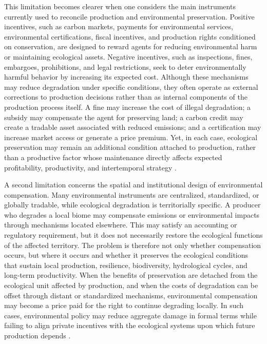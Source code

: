 

This limitation becomes clearer when one considers the main instruments currently used to reconcile production and environmental preservation. Positive incentives, such as carbon markets, payments for environmental services, environmental certifications, fiscal incentives, and production rights conditioned on conservation, are designed to reward agents for reducing environmental harm or maintaining ecological assets. Negative incentives, such as inspections, fines, embargoes, prohibitions, and legal restrictions, seek to deter environmentally harmful behavior by increasing its expected cost. Although these mechanisms may reduce degradation under specific conditions, they often operate as external corrections to production decisions rather than as internal components of the production process itself. A fine may increase the cost of illegal degradation; a subsidy may compensate the agent for preserving land; a carbon credit may create a tradable asset associated with reduced emissions; and a certification may increase market access or generate a price premium. Yet, in each case, ecological preservation may remain an additional condition attached to production, rather than a productive factor whose maintenance directly affects expected profitability, productivity, and intertemporal strategy \cite{placeholder_positive_incentives, placeholder_enforcement}.

A second limitation concerns the spatial and institutional design of environmental compensation. Many environmental instruments are centralized, standardized, or globally tradable, while ecological degradation is territorially specific. A producer who degrades a local biome may compensate emissions or environmental impacts through mechanisms located elsewhere. This may satisfy an accounting or regulatory requirement, but it does not necessarily restore the ecological functions of the affected territory. The problem is therefore not only whether compensation occurs, but where it occurs and whether it preserves the ecological conditions that sustain local production, resilience, biodiversity, hydrological cycles, and long-term productivity. When the benefits of preservation are detached from the ecological unit affected by production, and when the costs of degradation can be offset through distant or standardized mechanisms, environmental compensation may become a price paid for the right to continue degrading locally. In such cases, environmental policy may reduce aggregate damage in formal terms while failing to align private incentives with the ecological systems upon which future production depends \cite{placeholder_spatial_compensation, placeholder_biome_governance}.

